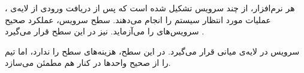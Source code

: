 
هر نرم‌افزار، از چند سرویس تشکیل شده است که پس از دریافت ورودی از لایه‌ی
، عملیات مورد انتظار سیستم را انجام می‌دهند. 
سطح سرویس، عملکرد صحیح سرویس‌های  را می‌آزماید. 
 نیز در این سطح قرار می‌گیرد .

 سرویس در لایه‌ی میانی  قرار می‌گیرد. 
در این سطح، هزینه‌های  سطح  را ندارد، اما تیم را
از  صحیح واحدها در کنار هم مطمئن می‌سازد.


